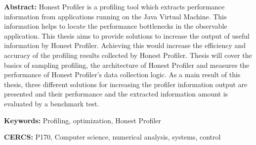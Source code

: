 \documentclass{style/thesis}
\begin{document}
\noindent\textbf{\large \articleName}
\vspace*{3ex}
\begin{flushleft}
  \textbf{Abstract:} 
  Honest Profiler is a profiling tool which extracts performance information from applications running on the Java Virtual Machine. This information helps to locate the performance bottlenecks in the observable application. This thesis aims to provide solutions to increase the output of useful information by Honest Profiler. Achieving this would increase the efficiency and accuracy of the profiling results collected by Honest Profiler. Thesis will cover the basics of sampling profiling, the architecture of Honest Profiler and measures the performance of Honest Profiler's data collection logic. As a main result of this thesis, three different solutions for increasing the profiler information output are presented and their performance and the extracted information amount is evaluated by a benchmark test.
  
\end{flushleft}


\vspace*{3ex}
\begin{flushleft}
  \textbf{Keywords:} 
  Profiling, optimization, Honest Profiler
\end{flushleft}
\vspace*{3ex}

\noindent\textbf{CERCS:} 
  P170, Computer science, numerical analysis, systems, control 
\end{document}
